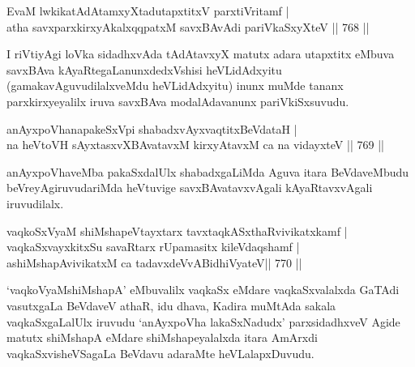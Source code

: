 \begin{shl}
EvaM lwkikatAdAtamxyXtadutapxtitxV parxtiVritamf | \\
atha savxparxkirxyAkalxqqpatxM savxBAvAdi pariVkaSxyXteV \hfill||  768 ||  
\end{shl}

\begin{artha}
I riVtiyAgi loVka sidadhxvAda tAdAtavxyX matutx adara utapxtitx eMbuva savxBAva kAyaRtegaLanunxdedxVshisi heVLidAdxyitu (gamakavAguvudilalxveMdu heVLidAdxyitu) inunx muMde tananx parxkirxyeyalilx iruva savxBAva modalAdavanunx pariVkiSxsuvudu.
\end{artha}


\begin{shl}
\footnotemark[1]anAyxpoVhanapakeSxV\s pi shabadxvAyxvaqtitxBeVdataH | \\
na heVtoVH sAyxtasxvXBAvatavxM kirxyAtavxM ca na vidayxteV \hfill||  769 ||  
\end{shl}

\begin{artha}
anAyxpoVhaveMba pakaSxdalUlx shabadxgaLiMda Aguva itara BeVdaveMbudu beVreyAgiruvudariMda heVtuvige savxBAvatavxvAgali kAyaRtavxvAgali iruvudilalx.
\end{artha}


\begin{shl}
vaqkoSxV\s yaM \footnotemark[2]shiMshapeVtayxtarx tavxtaqkASxthaRvivikatxkamf | \\
vaqkaSxvayxkitxSu savaRtarx rUpamasitx kileVdaqshamf | \\
ashiMshapAvivikatxM ca tadavxdeVvABidhiVyateV\hfill ||  770 ||  
\end{shl}

\begin{artha}
`vaqkoV\s yaMshiMshapA' eMbuvalilx vaqkaSx eMdare vaqkaSxvalalxda GaTAdi vasutxgaLa BeVdaveV athaR, idu dhava, Kadira muMtAda sakala vaqkaSxgaLalUlx iruvudu `anAyxpoVha lakaSxNadudx' parxsidadhxveV Agide matutx shiMshapA eMdare shiMshapeyalalxda itara AmArxdi vaqkaSxvisheVSagaLa BeVdavu adaraMte heVLalapxDuvudu.
\end{artha}


